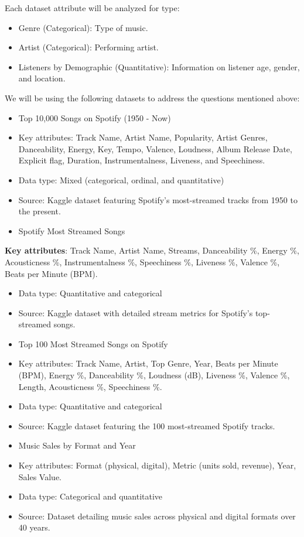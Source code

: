 \documentclass[12pt]{article}
\begin{document}
Each dataset attribute will be analyzed for type:

\begin{itemize}
  \item Genre (Categorical): Type of music.
  \item Artist (Categorical): Performing artist.
  \item Listeners by Demographic (Quantitative): Information on listener age, gender, and location.
\end{itemize}

We will be using the following datasets to address the questions mentioned above:

\begin{itemize}
  \item Top 10,000 Songs on Spotify (1950 - Now)
  \item Key attributes: Track Name, Artist Name, Popularity, Artist Genres, Danceability, Energy, Key, Tempo, Valence, Loudness, Album Release Date, Explicit flag, Duration, Instrumentalness, Liveness, and Speechiness.
  \item Data type: Mixed (categorical, ordinal, and quantitative)
  \item Source: Kaggle dataset featuring Spotify's most-streamed tracks from 1950 to the present.
  \item Spotify Most Streamed Songs
\end{itemize}

\textbf{Key attributes}: Track Name, Artist Name, Streams, Danceability \%, Energy \%, Acousticness \%, Instrumentalness \%, Speechiness \%, Liveness \%, Valence \%, Beats per Minute (BPM).

\begin{itemize}
  \item Data type: Quantitative and categorical
  \item Source: Kaggle dataset with detailed stream metrics for Spotify's top-streamed songs.
  \item Top 100 Most Streamed Songs on Spotify
  \item Key attributes: Track Name, Artist, Top Genre, Year, Beats per Minute (BPM), Energy \%, Danceability \%, Loudness (dB), Liveness \%, Valence \%, Length, Acousticness \%, Speechiness \%.
  \item Data type: Quantitative and categorical
  \item Source: Kaggle dataset featuring the 100 most-streamed Spotify tracks.
  \item Music Sales by Format and Year
  \item Key attributes: Format (physical, digital), Metric (units sold, revenue), Year, Sales Value.
  \item Data type: Categorical and quantitative
  \item Source: Dataset detailing music sales across physical and digital formats over 40 years.
\end{itemize}
\end{document}
